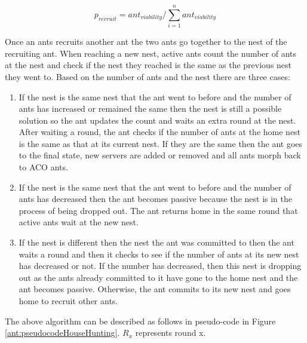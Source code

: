 \begin{equation}
p_{recruit} = ant_{viability} / \sum\limits_{i=1}^n ant_{viability}
\end{equation}

Once an ants recruits another ant the two ants go together to the nest of the recruiting ant. When reaching a new nest, active ants count the number of ants at the nest and check if the nest they reached is the same as the previous nest they went to. Based on the number of ants and the nest there are three cases:

\begin{enumerate}
	\item If the nest is the same nest that the ant went to before and the number of ants has increased or remained the same then the nest is still a possible solution so the ant updates the count and waits an extra round at the nest. After waiting a round, the ant checks if the number of ants at the home nest is the same as that at its current nest. If they are the same then the ant goes to the final state, new servers are added or removed and all ants morph back to ACO ants.
	\item If the nest is the same nest that the ant went to before and the number of ants has decreased then the ant becomes passive because the nest is in the process of being dropped out. The ant returns home in the same round that active ants wait at the new nest.
	\item If the nest is different then the nest the ant was committed to then the ant waits a round and then it checks to see if the number of ants at its new nest has decreased or not. If the number has decreased, then this nest is dropping out as the ants already committed to it have gone to the home nest and the ant becomes passive. Otherwise, the ant commits to its new nest and goes home to recruit other ants.
\end{enumerate}

The above algorithm can be described as follows in pseudo-code in Figure \ref{ant:pseudocodeHouseHunting}. $R_{x}$ represents round x.

